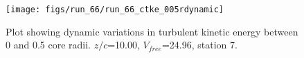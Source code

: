 \begin{figure}[H]
\centering
\texttt{[image: figs/run\_66/run\_66\_ctke\_005rdynamic]}
\caption{Plot showing dynamic variations in turbulent kinetic energy between 0 and 0.5 core radii. $z/c$=10.00, $V_{free}$=24.96, station 7.}
\end{figure}


